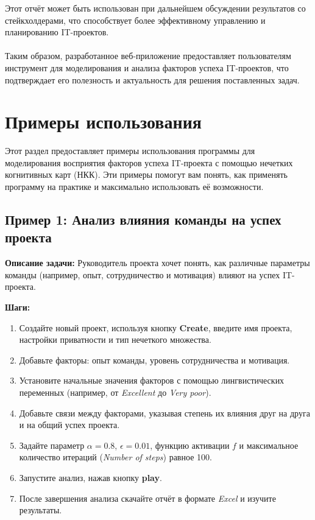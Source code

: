 \documentclass{article}
\begin{document}
    Этот отчёт может быть использован при дальнейшем обсуждении результатов со стейкхолдерами, что способствует более эффективному управлению и планированию IT-проектов.\\
    ~\\
    Таким образом, разработанное веб-приложение предоставляет пользователям инструмент для моделирования и анализа факторов успеха IT-проектов, что подтверждает его полезность и актуальность для решения поставленных задач.\\

    \section{Примеры использования}

    Этот раздел предоставляет примеры использования программы для моделирования восприятия факторов успеха IT-проекта с помощью нечетких когнитивных карт (НКК). Эти примеры помогут вам понять, как применять программу на практике и максимально использовать её возможности.

    \subsection{Пример 1: Анализ влияния команды на успех проекта}

    \textbf{Описание задачи:} Руководитель проекта хочет понять, как различные параметры команды (например, опыт, сотрудничество и мотивация) влияют на успех IT-проекта.

    \textbf{Шаги:}
    \begin{enumerate}
        \item Создайте новый проект, используя кнопку \textbf{Create}, введите имя проекта, настройки приватности и тип нечеткого множества.
        \item Добавьте факторы: опыт команды, уровень сотрудничества и мотивация.
        \item Установите начальные значения факторов с помощью лингвистических переменных (например, от \textit{Excellent} до \textit{Very poor}).
        \item Добавьте связи между факторами, указывая степень их влияния друг на друга и на общий успех проекта.
        \item Задайте параметр $\alpha = 0.8$, $\epsilon = 0.01$, функцию активации $f$ и максимальное количество итераций (\textit{Number of steps}) равное 100.
        \item Запустите анализ, нажав кнопку \textbf{play}.
        \item После завершения анализа скачайте отчёт в формате \textit{Excel} и изучите результаты.
    \end{enumerate}
\end{document}
